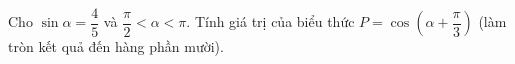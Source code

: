 \begin{ex}
Cho $\sin\alpha=\dfrac45$ và $\dfrac{\pi}{2}<\alpha<\pi$. Tính giá trị của biểu thức $P=\cos\left(\alpha+\dfrac{\pi}{3}\right)$ (làm tròn kết quả đến hàng phần mười).
\end{ex}
